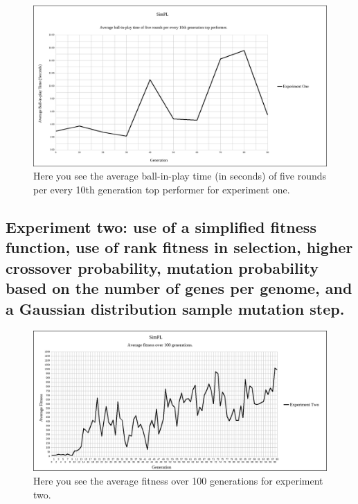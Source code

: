 \documentclass[a4paper,10pt]{article}
\begin{document}
\begin{figure}[H]  
  \centering
  \includegraphics[width=1\textwidth]{figures/exp1_10_tops_times.png}
  \caption{Here you see the average ball-in-play time (in seconds) of five rounds per every 10th generation top performer for experiment one.}
  \label{fig:exp1_10_tops_times}
\end{figure}

\subsection{Experiment two: use of a simplified fitness function, use of rank fitness in selection, higher crossover probability, mutation probability based on the number of genes per genome, and a Gaussian distribution sample mutation step.}

\begin{figure}[H]  
  \centering
  \includegraphics[width=1\textwidth]{figures/exp2_avg_fit.png}
  \caption{Here you see the average fitness over 100 generations for experiment two.}
  \label{fig:exp2_avg_fit}
\end{figure}
\end{document}
